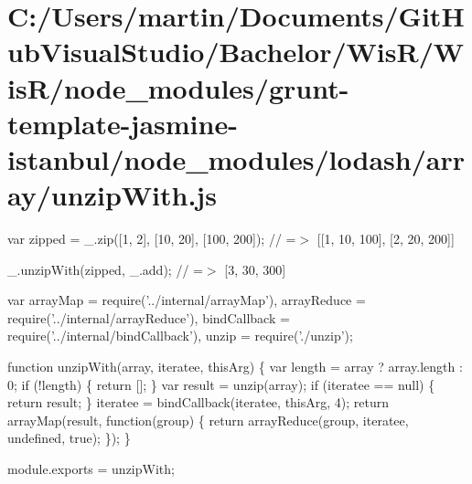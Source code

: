 \hypertarget{_c_1_2_users_2martin_2_documents_2_git_hub_visual_studio_2_bachelor_2_wis_r_2_wis_r_2node_modulefda2a0743cceb0c8a04ae7ff361f73b5}{}\section{C\+:/\+Users/martin/\+Documents/\+Git\+Hub\+Visual\+Studio/\+Bachelor/\+Wis\+R/\+Wis\+R/node\+\_\+modules/grunt-\/template-\/jasmine-\/istanbul/node\+\_\+modules/lodash/array/unzip\+With.\+js}
var zipped = \+\_\+.\+zip(\mbox{[}1, 2\mbox{]}, \mbox{[}10, 20\mbox{]}, \mbox{[}100, 200\mbox{]}); // =$>$ \mbox{[}\mbox{[}1, 10, 100\mbox{]}, \mbox{[}2, 20, 200\mbox{]}\mbox{]}

\+\_\+.\+unzip\+With(zipped, \+\_\+.\+add); // =$>$ \mbox{[}3, 30, 300\mbox{]}


\begin{DoxyCodeInclude}
var arrayMap = require(\textcolor{stringliteral}{'../internal/arrayMap'}),
    arrayReduce = require(\textcolor{stringliteral}{'../internal/arrayReduce'}),
    bindCallback = require(\textcolor{stringliteral}{'../internal/bindCallback'}),
    unzip = require(\textcolor{stringliteral}{'./unzip'});

\textcolor{keyword}{function} unzipWith(array, iteratee, thisArg) \{
  var length = array ? array.length : 0;
  \textcolor{keywordflow}{if} (!length) \{
    \textcolor{keywordflow}{return} [];
  \}
  var result = unzip(array);
  \textcolor{keywordflow}{if} (iteratee == null) \{
    \textcolor{keywordflow}{return} result;
  \}
  iteratee = bindCallback(iteratee, thisArg, 4);
  \textcolor{keywordflow}{return} arrayMap(result, \textcolor{keyword}{function}(group) \{
    \textcolor{keywordflow}{return} arrayReduce(group, iteratee, undefined, \textcolor{keyword}{true});
  \});
\}

module.exports = unzipWith;
\end{DoxyCodeInclude}
 